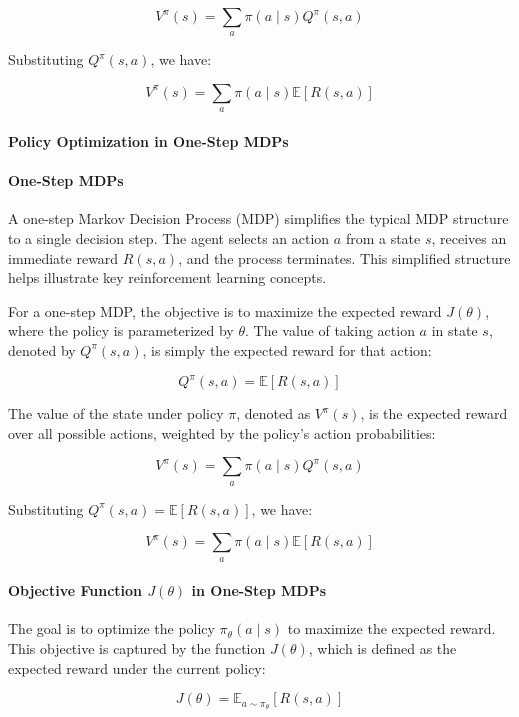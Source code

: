 \documentclass[10pt, oneside]{article}
\theoremstyle{definition}
\begin{document}
\[
V^\pi(s) = \sum_{a} \pi(a \mid s) Q^\pi(s, a)
\]

Substituting $Q^\pi(s, a)$, we have:

\[
V^\pi(s) = \sum_{a} \pi(a \mid s) \mathbb{E}[R(s, a)]
\]

\paragraph{Policy Optimization in One-Step MDPs}

\paragraph{One-Step MDPs}

A one-step Markov Decision Process (MDP) simplifies the typical MDP structure to a single decision step. The agent selects an action \( a \) from a state \( s \), receives an immediate reward \( R(s, a) \), and the process terminates. This simplified structure helps illustrate key reinforcement learning concepts.

For a one-step MDP, the objective is to maximize the expected reward \( J(\theta) \), where the policy is parameterized by \( \theta \). The value of taking action \( a \) in state \( s \), denoted by \( Q^\pi(s, a) \), is simply the expected reward for that action:

\[
Q^\pi(s, a) = \mathbb{E}[R(s, a)]
\]

The value of the state under policy \( \pi \), denoted as \( V^\pi(s) \), is the expected reward over all possible actions, weighted by the policy's action probabilities:

\[
V^\pi(s) = \sum_{a} \pi(a \mid s) Q^\pi(s, a)
\]

Substituting \( Q^\pi(s, a) = \mathbb{E}[R(s, a)] \), we have:

\[
V^\pi(s) = \sum_{a} \pi(a \mid s) \mathbb{E}[R(s, a)]
\]

\paragraph{Objective Function \( J(\theta) \) in One-Step MDPs}

The goal is to optimize the policy \( \pi_\theta(a \mid s) \) to maximize the expected reward. This objective is captured by the function \( J(\theta) \), which is defined as the expected reward under the current policy:

\[
J(\theta) = \mathbb{E}_{a \sim \pi_\theta} [R(s, a)]
\]
\end{document}
